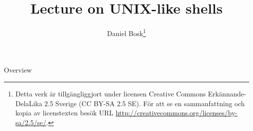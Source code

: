 \documentclass[handout]{beamer}
\title[UNIX-like shells]{%
	Lecture on UNIX-like shells
}
\author{Daniel Bosk\footnote{%
	Detta verk är tillgängliggjort under licensen Creative Commons 
	Erkännande-DelaLika 2.5 Sverige (CC BY-SA 2.5 SE).
	För att se en sammanfattning och kopia av licenstexten besök URL 
	\url{http://creativecommons.org/licenses/by-sa/2.5/se/}.
}}
\institute{%
	Department of Information Technology and Media (ITM),\\
	Mid Sweden University, Sundsvall.
}
\date{\svnId}
\begin{document}
\begin{frame}
  \titlepage
\end{frame}

\begin{frame}{Overview}
	\tableofcontents
\end{frame}



\end{document}
